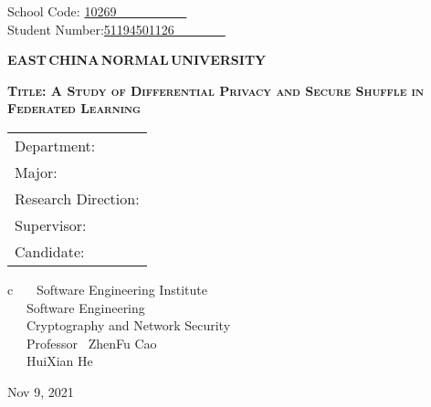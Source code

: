 \newpage

\pagestyle{empty}

\hskip 1.4cm {School Code: \underline{10269~~~~~~~~~~~\qquad}}\\
\hspace*{\fill} {Student Number:\underline{51194501126~~~~~~~~}}
\vskip 2cm

\begin{center}
{\Huge \bf EAST\,CHINA\,NORMAL\,UNIVERSITY}
\end{center}

\vskip 3cm

\begin{center}
{\huge \bf \scshape Title: A Study of Differential Privacy and Secure Shuffle in Federated Learning}
\end{center}

\vskip 2cm {\large
\begin{center}
\begin{tabular}{l}
Department:\\
Major:\\
Research Direction:\\
Supervisor:\\
Candidate:
\end{tabular}
\begin{tabular}c
~~~Software Engineering Institute\\
\hline ~~~Software Engineering  \\
\hline ~~~Cryptography and Network Security\\
\hline ~~~Professor ~ZhenFu Cao~  \\
\hline ~~~HuiXian He  \\
\hline
\end{tabular}
\end{center}}

\vskip 30mm

\begin{center}
{\Large Nov 9, 2021}
\end{center}

